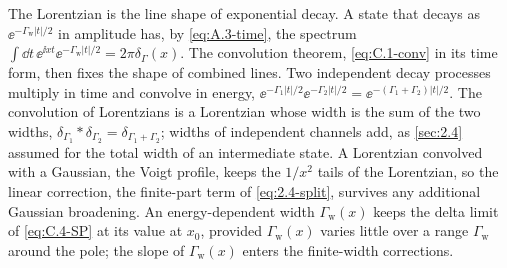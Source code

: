 The Lorentzian is the line shape of exponential decay. A state that decays as $\ee^{-\varGamma_{\mathrm{w}}|t|/2}$ in amplitude has, by \cref{eq:A.3-time}, the spectrum $\int\dd t\,\ee^{\ii xt}\ee^{-\varGamma_{\mathrm{w}}|t|/2} = 2\pi\delta_{\varGamma}(x)$. The convolution theorem, \cref{eq:C.1-conv} in its time form, then fixes the shape of combined lines. Two independent decay processes multiply in time and convolve in energy, $\ee^{-\varGamma_1|t|/2}\ee^{-\varGamma_2|t|/2} = \ee^{-(\varGamma_1 + \varGamma_2)|t|/2}$. The convolution of Lorentzians is a Lorentzian whose width is the sum of the two widths, $\delta_{\varGamma_1}\ast\delta_{\varGamma_2} = \delta_{\varGamma_1 + \varGamma_2}$; widths of independent channels add, as \cref{sec:2.4} assumed for the total width of an intermediate state. A Lorentzian convolved with a Gaussian, the Voigt profile, keeps the $1/x^2$ tails of the Lorentzian, so the linear correction, the finite-part term of \cref{eq:2.4-split}, survives any additional Gaussian broadening. An energy-dependent width $\varGamma_{\mathrm{w}}(x)$ keeps the delta limit of \cref{eq:C.4-SP} at its value at $x_0$, provided $\varGamma_{\mathrm{w}}(x)$ varies little over a range $\varGamma_{\mathrm{w}}$ around the pole; the slope of $\varGamma_{\mathrm{w}}(x)$ enters the finite-width corrections.

